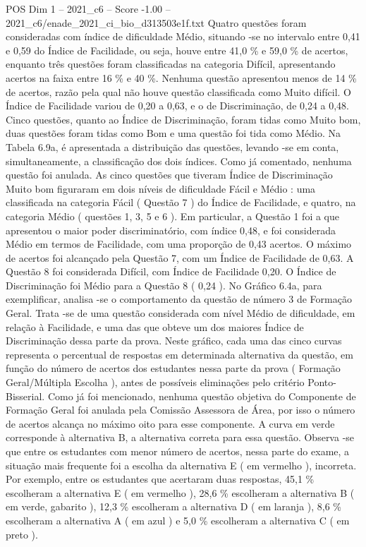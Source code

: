 \begin{textsample}{POS Dim 1 – 2021\_c6 – Score -1.00 – 2021\_c6/enade\_2021\_ci\_bio\_d313503e1f.txt}
Quatro questões foram consideradas com índice de dificuldade Médio, situando -se no intervalo entre 0,41 e 0,59 do Índice de Facilidade, ou seja, houve entre 41,0 \% e 59,0 \% de acertos, enquanto três questões foram classificadas na categoria Difícil, apresentando acertos na faixa entre 16 \% e 40 \%.
Nenhuma questão apresentou menos de 14 \% de acertos, razão pela qual não houve questão classificada como Muito difícil.
O Índice de Facilidade variou de 0,20 a 0,63, e o de Discriminação, de 0,24 a 0,48.
Cinco questões, quanto ao Índice de Discriminação, foram tidas como Muito bom, duas questões foram tidas como Bom e uma questão foi tida como Médio.
Na Tabela 6.9a, é apresentada a distribuição das questões, levando -se em conta, simultaneamente, a classificação dos dois índices.
Como já comentado, nenhuma questão foi anulada.
As cinco questões que tiveram Índice de Discriminação Muito bom figuraram em dois níveis de dificuldade Fácil e Médio : uma classificada na categoria Fácil ( Questão 7 ) do Índice de Facilidade, e quatro, na categoria Médio ( questões 1, 3, 5 e 6 ).
Em particular, a Questão 1 foi a que apresentou o maior poder discriminatório, com índice 0,48, e foi considerada Médio em termos de Facilidade, com uma proporção de 0,43 acertos.
O máximo de acertos foi alcançado pela Questão 7, com um Índice de Facilidade de 0,63.
A Questão 8 foi considerada Difícil, com Índice de Facilidade 0,20.
O Índice de Discriminação foi Médio para a Questão 8 ( 0,24 ).
No Gráfico 6.4a, para exemplificar, analisa -se o comportamento da questão de número 3 de Formação Geral.
Trata -se de uma questão considerada com nível Médio de dificuldade, em relação à Facilidade, e uma das que obteve um dos maiores Índice de Discriminação dessa parte da prova.
Neste gráfico, cada uma das cinco curvas representa o percentual de respostas em determinada alternativa da questão, em função do número de acertos dos estudantes nessa parte da prova ( Formação Geral/Múltipla Escolha ), antes de possíveis eliminações pelo critério Ponto-Bisserial.
Como já foi mencionado, nenhuma questão objetiva do Componente de Formação Geral foi anulada pela Comissão Assessora de Área, por isso o número de acertos alcança no máximo oito para esse componente.
A curva em verde corresponde à alternativa B, a alternativa correta para essa questão.
Observa -se que entre os estudantes com menor número de acertos, nessa parte do exame, a situação mais frequente foi a escolha da alternativa E ( em vermelho ), incorreta.
Por exemplo, entre os estudantes que acertaram duas respostas, 45,1 \% escolheram a alternativa E ( em vermelho ), 28,6 \% escolheram a alternativa B ( em verde, gabarito ), 12,3 \% escolheram a alternativa D ( em laranja ), 8,6 \% escolheram a alternativa A ( em azul ) e 5,0 \% escolheram a alternativa C ( em preto ).

\end{textsample}
